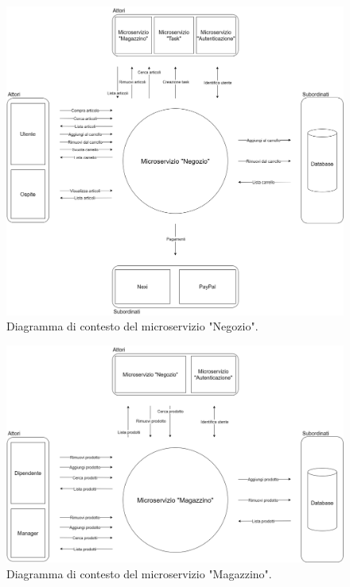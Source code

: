 \documentclass{report}
\begin{document}
\begin{figure}[H]
	\centering\includegraphics[width=1\textwidth]{images/Diagrammi_Contesto/Diagramma_Contesto_Negozio.png}
	Diagramma di contesto del microservizio "Negozio".
\end{figure}

\begin{figure}[H]
	\centering\includegraphics[width=1\textwidth]{images/Diagrammi_Contesto/Diagramma_Contesto_Magazzino.png}
	Diagramma di contesto del microservizio "Magazzino".
\end{figure}
\end{document}
